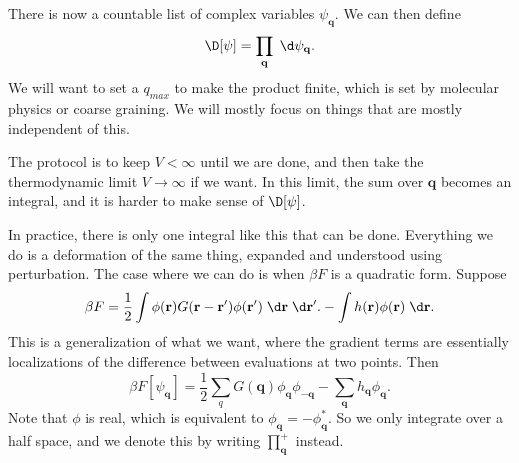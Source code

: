 \documentclass[a4paper]{article}
\begin{document}
There is now a countable list of complex variables $\psi_\mathbf{q}$. We can then define
\[
  \D [\psi] = \prod_{\mathbf{q}} \;\d \psi_\mathbf{q}.
\]
We will want to set a $q_{max}$ to make the product finite, which is set by molecular physics or coarse graining. We will mostly focus on things that are mostly independent of this.

The protocol is to keep $V < \infty$ until we are done, and then take the thermodynamic limit $V \to \infty$ if we want. In this limit, the sum over $\mathbf{q}$ becomes an integral, and it is harder to make sense of $\D[\psi]$.

In practice, there is only one integral like this that can be done. Everything we do is a deformation of the same thing, expanded and understood using perturbation. The case where we can do is when $\beta F$ is a quadratic form. Suppose
\[
  \beta F = \frac{1}{2} \int \phi(\mathbf{r}) G(\mathbf{r} - \mathbf{r}') \phi(\mathbf{r}')\;\d \mathbf{r}\;\d \mathbf{r}'. - \int h(\mathbf{r}) \phi(\mathbf{r})\;\d \mathbf{r}.
\]
This is a generalization of what we want, where the gradient terms are essentially localizations of the difference between evaluations at two points. Then
\[
  \beta F[\psi_\mathbf{q}] = \frac{1}{2} \sum_q G(\mathbf{q}) \phi_\mathbf{q} \phi_{-\mathbf{q}} - \sum_\mathbf{q} h_\mathbf{q} \phi_\mathbf{q}.
\]
Note that $\phi$ is real, which is equivalent to $\phi_\mathbf{q} = - \phi_\mathbf{q}^*$. So we only integrate over a half space, and we denote this by writing $\prod_\mathbf{q}^+$ instead.
\end{document}

